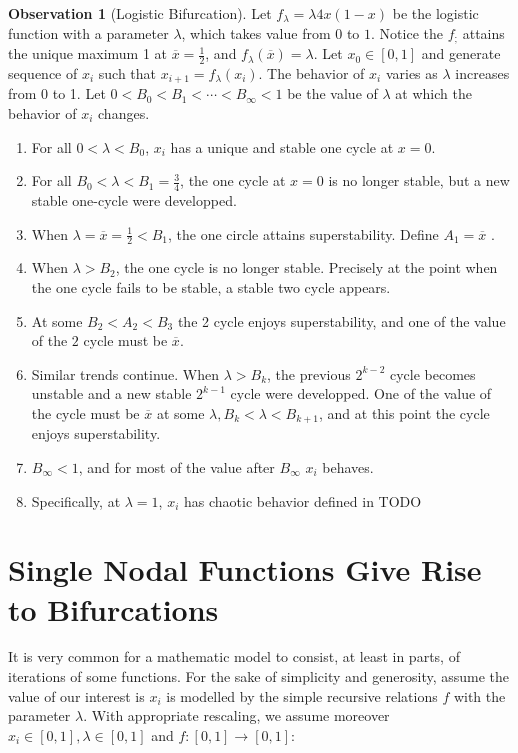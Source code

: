 \documentclass{report}
\theoremstyle{definition}
\theoremstyle{definition}
\newtheorem{observation}[thm]{Observation}
\theoremstyle{remark}
\newcommand{\mx}{\overline{x}}
\begin{document}
\begin{observation}[Logistic Bifurcation]\label{th:logistic_bifurcation}
	Let $f_{\lambda} = \lambda 4x(1-x) $ be the logistic function with a parameter $\lambda$, which takes value from $0$ to $1$. 
	Notice the $f_{;}$ attains the unique maximum 1 at $\mx = \frac{1}{2}$, and $f_{\lambda}(\mx) = \lambda$.
	Let $x_0 \in [0,1]$ and generate sequence of $x_i$ such that $x_{i+1} = f_{\lambda}(x_i)$.
	The behavior of $x_i$ varies as $\lambda$ increases from 0 to 1. Let $0 < B_0 < B_1 < \cdots < B_{\infty} < 1$ be the value of $\lambda$ at which the behavior of $x_i$ changes.

	\begin{enumerate}
		\item For all $0 < \lambda < B_0$, $x_i$ has a unique and stable one cycle at $x=0$.
		\item For all $B_0 <\lambda < B_1 = \frac{3}{4}$, the one cycle at $x=0$ is no longer stable, but a new stable one-cycle were developped.
		\item When $\lambda = \mx = \frac{1}{2}< B_1$, the one circle attains superstability. Define $A_1 = \mx$ .
		\item When $\lambda > B_2$, the one cycle is no longer stable. Precisely at the point when the one cycle fails to be stable, a stable two cycle appears.
		\item At some $B_2 <A_2 < B_3$ the 2 cycle enjoys superstability, and one of the value of the $2$ cycle must be $\mx$.
		\item Similar trends continue. When $\lambda > B_k$, the previous $2^{k-2}$ cycle becomes unstable and a new stable $2^{k-1}$ cycle were developped. One of the value of the cycle must be $\mx$ at some $\lambda, B_k <\lambda < B_{k+1}$, and at this point the cycle enjoys superstability.
		\item $B_{\infty} < 1$, and for most of the value after $B_{\infty}$ $x_i$ behaves. 
		\item Specifically, at $\lambda = 1$, $x_i$ has chaotic behavior defined in TODO
	\end{enumerate}

\end{observation}

\section{Single Nodal Functions Give Rise to Bifurcations}

It is very common for a mathematic model to consist, at least in parts, of iterations of some functions.
For the sake of simplicity and generosity, assume the value of our interest is $x_i$ is modelled by the simple recursive relations $f$ with the parameter $\lambda$. With appropriate rescaling, we assume moreover $x_i \in [0,1], \lambda \in [0,1]$ and $f: [0,1] \rightarrow [0,1]$:
\end{document}
